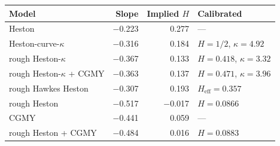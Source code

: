 \begin{tabular}{lrrl}
\toprule
Model & Slope & Implied $H$ & Calibrated\\
\midrule
Heston & $-$0.223 & 0.277 & ---\\
Heston-curve-$\kappa$ & $-$0.316 & 0.184 & $H = 1/2$, $\kappa = 4.92$\\
rough Heston-$\kappa$ & $-$0.367 & 0.133 & $H = 0.418$, $\kappa = 3.32$\\
rough Heston-$\kappa$ + CGMY & $-$0.363 & 0.137 & $H = 0.471$, $\kappa = 3.96$\\
rough Hawkes Heston & $-$0.307 & 0.193 & $H_{\mathrm{eff}} = 0.357$\\
\midrule
rough Heston & $-$0.517 & $-$0.017 & $H = 0.0866$\\
CGMY & $-$0.441 & 0.059 & ---\\
rough Heston + CGMY & $-$0.484 & 0.016 & $H = 0.0883$\\
\bottomrule
\end{tabular}
